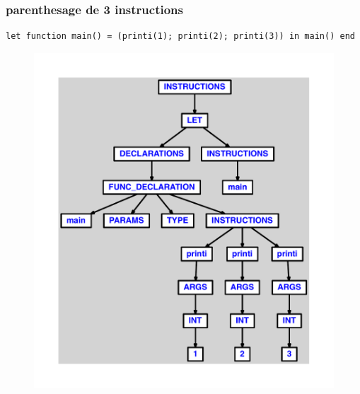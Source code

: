 \documentclass{article}
\begin{document}
\subsubsection{parenthesage de 3 instructions}
\begin{lstlisting}
let function main() = (printi(1); printi(2); printi(3)) in main() end
\end{lstlisting}
\newpage
\begin{figure}[H]
\centering
\includegraphics[max width=\textwidth]{ast/ast_137.pdf}
\end{figure}
\newpage
\end{document}

